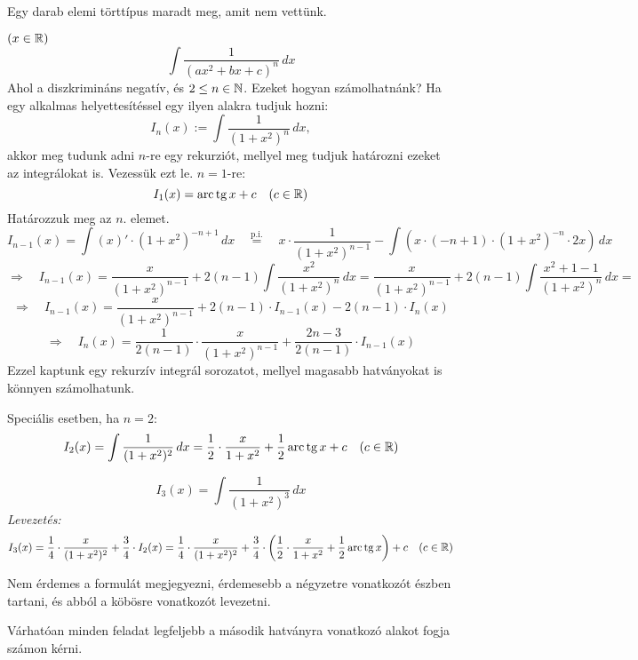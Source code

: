 \documentclass[a4paper,11.5pt]{article}
\DeclareMathOperator{\tg}{tg}
\DeclareMathOperator{\arc}{arc}
\begin{document}
	Egy darab elemi törttípus maradt meg, amit nem vettünk.
	\begin{example}$(x\in\mathbb{R})$
		\[ \int\frac{1}{(ax^2+bx+c)^n}\,dx \]
		Ahol a diszkrimináns negatív, és $2\leq n\in\mathbb{N}$. Ezeket hogyan számolhatnánk? Ha egy alkalmas helyettesítéssel egy ilyen alakra tudjuk hozni:
		\[ I_n(x):=\int\frac{1}{(1+x^2)^n}\,dx, \]
		akkor meg tudunk adni $n$-re egy rekurziót, mellyel meg tudjuk határozni ezeket az integrálokat is. Vezessük ezt le. $n=1$-re:
		\[I_1(x)=\arc\tg x+c\quad (c\in\R) \]
		Határozzuk meg az $n.$ elemet.
		\[ I_{n-1}(x)=\int(x)'\cdot(1+x^2)^{-n+1}\,dx\quad \overset{\text{p.i.}}{=}\quad x\cdot\frac{1}{(1+x^2)^{n-1}}-\int \left(x\cdot(-n+1)\cdot(1+x^2)^{-n}\cdot2x\right)\,dx \]
		\[ \Rightarrow\quad I_{n-1}(x)=\frac{x}{(1+x^2)^{n-1}}+2(n-1)\int\frac{x^2}{(1+x^2)^n}\,dx=\frac{x}{(1+x^2)^{n-1}}+2(n-1)\int\frac{x^2+1-1}{(1+x^2)^n}\,dx= \]
		\[ \Rightarrow\quad I_{n-1}(x)=\frac{x}{(1+x^2)^{n-1}}+2(n-1)\cdot I_{n-1}(x)-2(n-1)\cdot I_n(x) \]
		\[ \Rightarrow\quad I_n(x)=\frac{1}{2(n-1)}\cdot\frac{x}{(1+x^2)^{n-1}}+\frac{2n-3}{2(n-1)}\cdot I_{n-1}(x) \]
		Ezzel kaptunk egy rekurzív integrál sorozatot, mellyel magasabb hatványokat is könnyen számolhatunk.
	\end{example}
	\begin{note}
		Speciális esetben, ha $n=2$:
		\[ I_2(x)=\int\frac{1}{(1+x^2)^2}\,dx=\frac{1}{2}\cdot\frac{x}{1+x^2}+\frac{1}{2}\arc\tg x+c\quad (c\in\R) \]
	\end{note}
	\begin{exercise}
		\[ I_3(x)=\int\frac{1}{(1+x^2)^3}\,dx \]
		\textit{Levezetés:}
		\[ I_3(x)=\frac{1}{4}\cdot\frac{x}{(1+x^2)^2}+\frac{3}{4}\cdot I_2(x) =\frac{1}{4}\cdot\frac{x}{(1+x^2)^2}+\frac{3}{4}\cdot \left(\frac{1}{2}\cdot\frac{x}{1+x^2}+\frac{1}{2}\arc\tg x\right)+c\quad (c\in\R) \]
	\end{exercise}
	\begin{note}
		Nem érdemes a formulát megjegyezni, érdemesebb a négyzetre vonatkozót észben tartani, és abból a köbösre vonatkozót levezetni.
	\end{note}
	\begin{note}
		Várhatóan minden feladat legfeljebb a második hatványra vonatkozó alakot fogja számon kérni.
	\end{note}
\end{document}
